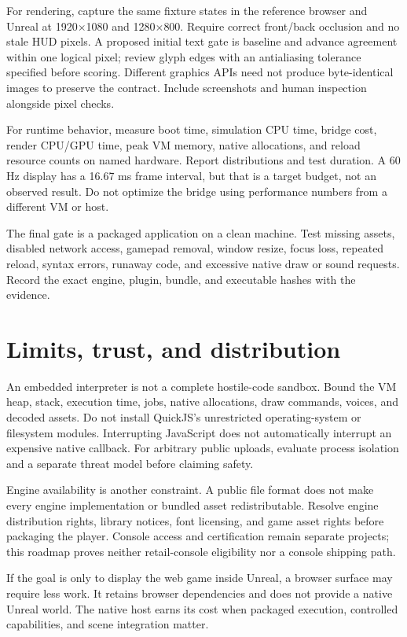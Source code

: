 \documentclass[10pt,letterpaper,twocolumn]{article}
\begin{document}
For rendering, capture the same fixture states in the reference browser and Unreal at 1920$\times$1080 and 1280$\times$800. Require correct front/back occlusion and no stale HUD pixels. A proposed initial text gate is baseline and advance agreement within one logical pixel; review glyph edges with an antialiasing tolerance specified before scoring. Different graphics APIs need not produce byte-identical images to preserve the contract. Include screenshots and human inspection alongside pixel checks.

For runtime behavior, measure boot time, simulation CPU time, bridge cost, render CPU/GPU time, peak VM memory, native allocations, and reload resource counts on named hardware. Report distributions and test duration. A 60 Hz display has a 16.67 ms frame interval, but that is a target budget, not an observed result. Do not optimize the bridge using performance numbers from a different VM or host.

The final gate is a packaged application on a clean machine. Test missing assets, disabled network access, gamepad removal, window resize, focus loss, repeated reload, syntax errors, runaway code, and excessive native draw or sound requests. Record the exact engine, plugin, bundle, and executable hashes with the evidence.

\section{Limits, trust, and distribution}\label{sec:limits}
An embedded interpreter is not a complete hostile-code sandbox. Bound the VM heap, stack, execution time, jobs, native allocations, draw commands, voices, and decoded assets. Do not install QuickJS's unrestricted operating-system or filesystem modules. Interrupting JavaScript does not automatically interrupt an expensive native callback. For arbitrary public uploads, evaluate process isolation and a separate threat model before claiming safety.

Engine availability is another constraint. A public file format does not make every engine implementation or bundled asset redistributable. Resolve engine distribution rights, library notices, font licensing, and game asset rights before packaging the player. Console access and certification remain separate projects; this roadmap proves neither retail-console eligibility nor a console shipping path.

If the goal is only to display the web game inside Unreal, a browser surface may require less work. It retains browser dependencies and does not provide a native Unreal world. The native host earns its cost when packaged execution, controlled capabilities, and scene integration matter.
\end{document}
